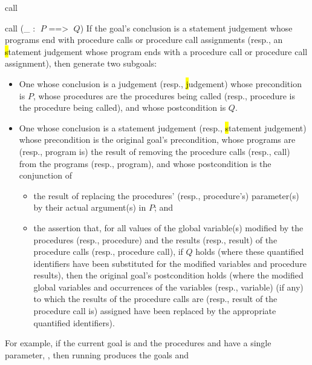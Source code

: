 \begin{tactic}{call}
  \begin{tsyntax}{call (_ : $\;P$ ==> $\;Q$)}
    If the goal's conclusion is a \prhl statement judgement whose
    programs end with procedure calls or procedure call assignments
    (resp., an \hl statement judgement whose program ends with a
    procedure call or procedure call assignment), then generate two
    subgoals:
  \begin{itemize}
  \item One whose conclusion is a \prhl judgement (resp., \hl
    judgement) whose precondition is $P$, whose procedures are the
    procedures being called (resp., procedure is the procedure being
    called), and whose postcondition is $Q$.

  \item One whose conclusion is a \prhl statement judgement (resp.,
    \hl statement judgement) whose precondition is the original goal's
    precondition, whose programs are (resp., program is) the result of
    removing the procedure calls (resp., call) from the programs
    (resp., program), and whose postcondition is the conjunction of
    \begin{itemize}
    \item the result of replacing the procedures' (resp., procedure's)
      parameter(s) by their actual argument(s) in $P$; and

    \item the assertion that, for all values of the global variable(s)
      modified by the procedures (resp., procedure) and the results
      (resp., result) of the procedure calls (resp., procedure call),
      if $Q$ holds (where these quantified identifiers have been
      substituted for the modified variables and procedure results),
      then the original goal's postcondition holds (where the modified
      global variables and occurrences of the variables (resp.,
      variable) (if any) to which the results of the procedure calls
      are (resp., result of the procedure call is) assigned have been
      replaced by the appropriate quantified identifiers).
    \end{itemize}
  \end{itemize}

  \medskip
  For example, if the current goal is
  and the procedures  and  have a single parameter,
  , then running
   produces the
  goals  and


\end{tsyntax}
\end{tactic}
